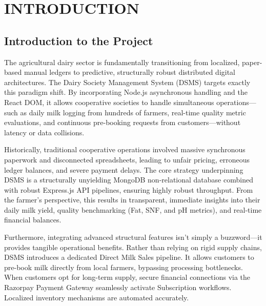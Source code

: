 \documentclass[12pt,a4paper]{report}
\begin{document}
\clearpage
\pagestyle{empty}
\tableofcontents
{}

\clearpage
{}
\listoffigures
{}

\clearpage
{}
\listoftables
{}

\clearpage
{}  %
\pagestyle{maincontent} %

\chapter{INTRODUCTION}
\section{Introduction to the Project}
\vspace{0.5cm}
The agricultural dairy sector is fundamentally transitioning from localized, paper-based manual ledgers to predictive, structurally robust distributed digital architectures. The Dairy Society Management System (DSMS) targets exactly this paradigm shift. By incorporating Node.js asynchronous handling and the React DOM, it allows cooperative societies to handle simultaneous operations—such as daily milk logging from hundreds of farmers, real-time quality metric evaluations, and continuous pre-booking requests from customers—without latency or data collisions.

Historically, traditional cooperative operations involved massive synchronous paperwork and disconnected spreadsheets, leading to unfair pricing, erroneous ledger balances, and severe payment delays. The core strategy underpinning DSMS is a structurally unyielding MongoDB non-relational database combined with robust Express.js API pipelines, ensuring highly robust throughput. From the farmer's perspective, this results in transparent, immediate insights into their daily milk yield, quality benchmarking (Fat, SNF, and pH metrics), and real-time financial balances.

Furthermore, integrating advanced structural features isn't simply a buzzword—it provides tangible operational benefits. Rather than relying on rigid supply chains, DSMS introduces a dedicated Direct Milk Sales pipeline. It allows customers to pre-book milk directly from local farmers, bypassing processing bottlenecks. When customers opt for long-term supply, secure financial connections via the Razorpay Payment Gateway seamlessly activate Subscription workflows. Localized inventory mechanisms are automated accurately.
\end{document}
